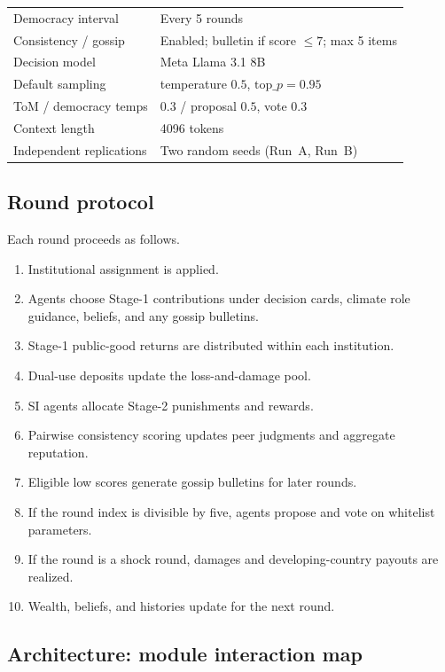 \begin{table}[h]
\begin{tabular}{@{}lp{}@{}}
Democracy interval & Every 5 rounds \\
Consistency / gossip & Enabled; bulletin if score $\le 7$; max 5 items \\
Decision model & Meta Llama 3.1 8B \\
Default sampling & temperature $0.5$, $\mathrm{top}\_p=0.95$ \\
ToM / democracy temps & $0.3$ / proposal $0.5$, vote $0.3$ \\
Context length & 4096 tokens \\
Independent replications & Two random seeds (Run~A, Run~B) \\
\bottomrule
\end{tabular}
\end{table}

\subsection{Round protocol}

Each round proceeds as follows.
\begin{enumerate}
\item Institutional assignment is applied.
\item Agents choose Stage-1 contributions under decision cards, climate role guidance, beliefs, and any gossip bulletins.
\item Stage-1 public-good returns are distributed within each institution.
\item Dual-use deposits update the loss-and-damage pool.
\item SI agents allocate Stage-2 punishments and rewards.
\item Pairwise consistency scoring updates peer judgments and aggregate reputation.
\item Eligible low scores generate gossip bulletins for later rounds.
\item If the round index is divisible by five, agents propose and vote on whitelist parameters.
\item If the round is a shock round, damages and developing-country payouts are realized.
\item Wealth, beliefs, and histories update for the next round.
\end{enumerate}

\subsection{Architecture: module interaction map}

